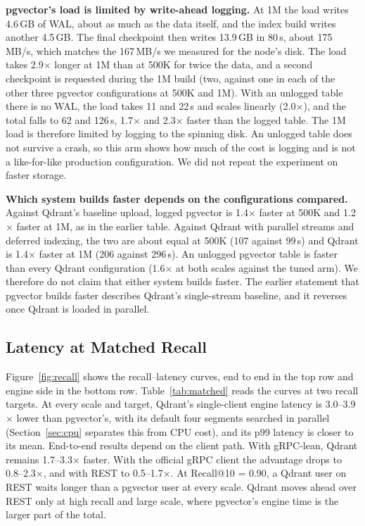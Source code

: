 \documentclass[sigconf, nonacm]{acmart}
\begin{document}
\textbf{pgvector's load is limited by write-ahead logging.} At 1M the load writes 4.6\,GB of
WAL, about as much as the data itself, and the index build writes another 4.5\,GB. The
final checkpoint then writes 13.9\,GB in 80\,s, about 175\,MB/s, which matches the
167\,MB/s we measured for the node's disk. The load takes 2.9$\times$ longer at 1M than at
500K for twice the data, and a second checkpoint is requested during the 1M build (two,
against one in each of the other three pgvector configurations at 500K and 1M). With an unlogged table there is no
WAL, the load takes 11 and 22\,s and scales linearly (2.0$\times$), and the total falls to
62 and 126\,s, 1.7$\times$ and 2.3$\times$ faster than the logged table. The 1M load is
therefore limited by logging to the spinning disk. An unlogged table does not survive a
crash, so this arm shows how much of the cost is logging and is not a like-for-like
production configuration. We did not repeat the experiment on faster storage.

\textbf{Which system builds faster depends on the configurations compared.} Against
Qdrant's baseline upload, logged pgvector is 1.4$\times$ faster at 500K and 1.2$\times$
faster at 1M, as in the earlier table. Against Qdrant with parallel streams and deferred
indexing, the two are about equal at 500K (107 against 99\,s) and Qdrant is 1.4$\times$
faster at 1M (206 against 296\,s). An unlogged pgvector table is faster than every Qdrant
configuration (1.6$\times$ at both scales against the tuned arm). We therefore do not claim
that either system builds faster. The earlier statement that pgvector builds faster
describes Qdrant's single-stream baseline, and it reverses once Qdrant is loaded in
parallel.

\subsection{Latency at Matched Recall}

Figure~\ref{fig:recall} shows the recall--latency curves, end to end in the top row and
engine side in the bottom row. Table~\ref{tab:matched} reads the curves at two recall
targets. At every scale and target, Qdrant's single-client engine latency is
3.0--3.9$\times$ lower than pgvector's, with its default four segments searched in
parallel (Section~\ref{sec:cpu} separates this from CPU cost), and its p99 latency is
closer to its mean. End-to-end results depend on the
client path. With gRPC-lean, Qdrant remains 1.7--3.3$\times$ faster. With the official
gRPC client the advantage drops to 0.8--2.3$\times$, and with REST to 0.5--1.7$\times$.
At Recall@10 = 0.90, a Qdrant user on REST waits longer than a pgvector user at every
scale. Qdrant moves ahead over REST only at high recall and large scale, where pgvector's
engine time is the larger part of the total.
\end{document}
